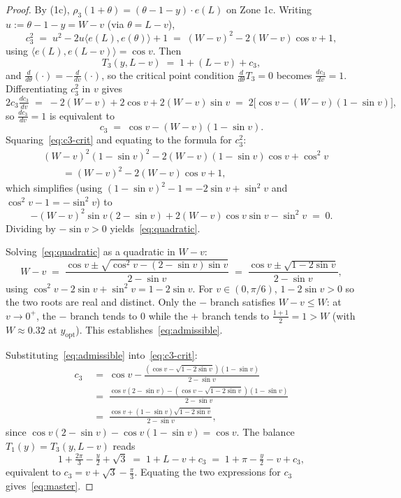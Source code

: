 \documentclass[11pt]{article}
\theoremstyle{plain}
\theoremstyle{definition}
\theoremstyle{remark}
\begin{document}
\begin{proof}
By (1c), $\rho_3(1 + \theta) = (\theta - 1 - y)\cdot
e(L)$ on Zone 1c. Writing $u := \theta - 1 - y = W - v$ (via $\theta =
L - v$),
\[
c_3^2 \;=\; u^2 - 2u\langle e(L), e(\theta)\rangle + 1
\;=\; (W-v)^2 - 2(W - v)\cos v + 1,
\]
using $\langle e(L), e(L - v)\rangle = \cos v$. Then
\begin{equation}
\label{eq:T3-param}
T_3(y, L - v) \;=\; 1 + (L - v) + c_3,
\end{equation}
and $\tfrac{d}{d\theta}(\cdot) = -\tfrac{d}{dv}(\cdot)$, so the
critical point condition $\tfrac{d}{d\theta} T_3 = 0$ becomes
$\tfrac{d c_3}{d v} = 1$. Differentiating $c_3^2$ in $v$ gives
\[
2 c_3 \tfrac{d c_3}{d v}
\;=\; -2(W-v) + 2\cos v + 2(W-v)\sin v
\;=\; 2\bigl[\cos v - (W-v)(1 - \sin v)\bigr],
\]
so $\tfrac{d c_3}{dv} = 1$ is equivalent to
\begin{equation}
\label{eq:c3-crit}
c_3 \;=\; \cos v - (W - v)(1 - \sin v).
\end{equation}
Squaring~\eqref{eq:c3-crit} and equating to the formula for $c_3^2$:
\begin{align*}
&(W-v)^2 (1 - \sin v)^2 - 2(W-v)(1 - \sin v)\cos v + \cos^2 v \\
&\qquad = (W-v)^2 - 2(W-v)\cos v + 1,
\end{align*}
which simplifies (using $(1-\sin v)^2 - 1 = -2\sin v + \sin^2 v$ and
$\cos^2 v - 1 = -\sin^2 v$) to
\[
-(W-v)^2 \sin v(2 - \sin v) + 2(W-v)\cos v \sin v - \sin^2 v \;=\; 0.
\]
Dividing by $-\sin v > 0$ yields~\eqref{eq:quadratic}.

Solving~\eqref{eq:quadratic} as a quadratic in $W-v$:
\[
W - v \;=\; \frac{\cos v \pm \sqrt{\cos^2 v - (2-\sin v)\sin v}}{2 - \sin v}
\;=\; \frac{\cos v \pm \sqrt{1 - 2\sin v}}{2 - \sin v},
\]
using $\cos^2 v - 2\sin v + \sin^2 v = 1 - 2\sin v$. For $v \in (0,
\pi/6)$, $1 - 2\sin v > 0$ so the two roots are real and distinct. Only
the $-$ branch satisfies $W - v \le W$: at $v \to 0^+$, the $-$ branch
tends to $0$ while the $+$ branch tends to $\tfrac{1 + 1}{2} = 1 > W$
(with $W \approx 0.32$ at $y_{\mathrm{opt}}$). This establishes~\eqref{eq:admissible}.

Substituting~\eqref{eq:admissible} into~\eqref{eq:c3-crit}:
\begin{align*}
c_3
&\;=\;\cos v - \tfrac{(\cos v - \sqrt{1-2\sin v})(1 - \sin v)}{2 - \sin v} \\
&\;=\; \tfrac{\cos v(2 - \sin v) - (\cos v - \sqrt{1-2\sin v})(1 - \sin v)}{2 - \sin v} \\
&\;=\; \tfrac{\cos v + (1 - \sin v)\sqrt{1 - 2\sin v}}{2 - \sin v},
\end{align*}
since $\cos v(2 - \sin v) - \cos v(1 - \sin v) = \cos v$. The balance
$T_1(y) = T_3(y, L - v)$ reads
\[
1 + \tfrac{2\pi}{3} - \tfrac{y}{2} + \sqrt 3
\;=\; 1 + L - v + c_3
\;=\; 1 + \pi - \tfrac{y}{2} - v + c_3,
\]
equivalent to $c_3 = v + \sqrt 3 - \tfrac{\pi}{3}$. Equating the two
expressions for $c_3$ gives~\eqref{eq:master}.


\end{proof}
\end{document}
